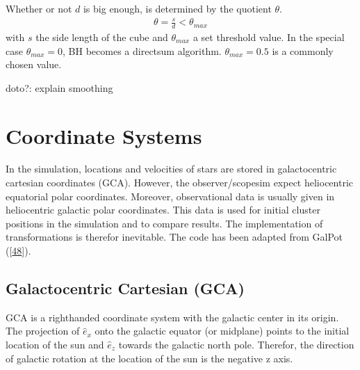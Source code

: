 \documentclass[letterpaper,10pt,english]{sphinxmanual}
\begin{document}
\sphinxAtStartPar
Whether or not \(d\) is big enough, is determined by the quotient \(\theta\).
\begin{equation*}
\begin{split}\theta = \frac{s}{d} < \theta_{max}\end{split}
\end{equation*}
\sphinxAtStartPar
with \(s\) the side length of the cube and \(\theta_{max}\) a set threshold value.
In the special case \(\theta_{max}=0\), BH becomes a direct\sphinxhyphen{}sum algorithm. \(\theta_{max}=0.5\) is a commonly chosen value.

\sphinxAtStartPar
doto?: explain smoothing


\chapter{Coordinate Systems}
\label{\detokenize{NBodySimulation/CoordinateSystems:coordinate-systems}}\label{\detokenize{NBodySimulation/CoordinateSystems::doc}}
\sphinxAtStartPar
In the simulation, locations and velocities of stars are stored in galactocentric cartesian coordinates (GCA).
However, the observer/scopesim expect heliocentric equatorial polar coordinates.
Moreover, observational data is usually given in heliocentric galactic polar coordinates.
This data is used for initial cluster positions in the simulation and to compare results.
The implementation of transformations is therefor inevitable. The code has been adapted from GalPot ({[}\hyperlink{cite.NBodySimulation/Appendix:id23}{48}{]}).


\section{Galactocentric Cartesian (GCA)}
\label{\detokenize{NBodySimulation/CoordinateSystems:galactocentric-cartesian-gca}}
\sphinxAtStartPar
GCA is a right\sphinxhyphen{}handed coordinate system with the galactic center in its origin.
The projection of \(\hat{e}_x\) onto the galactic equator (or midplane) points to the initial location of the sun and
\(\hat{e}_z\) towards the galactic north pole. Therefor, the direction of galactic rotation at the location of the sun is the negative z axis.
\end{document}

